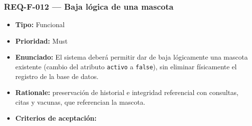 \documentclass[
  spanish,
]{article}
\providecommand{\tightlist}{%
  \setlength{\itemsep}{0pt}\setlength{\parskip}{0pt}}
\begin{document}
\subsubsection{REQ-F-012 --- Baja lógica de una
mascota}\label{req-f-012-baja-luxf3gica-de-una-mascota}

\begin{itemize}
\tightlist
\item
  \textbf{Tipo:} Funcional
\item
  \textbf{Prioridad:} Must
\item
  \textbf{Enunciado:} El sistema deberá permitir dar de baja lógicamente
  una mascota existente (cambio del atributo \texttt{activo} a
  \texttt{false}), sin eliminar físicamente el registro de la base de
  datos.
\item
  \textbf{Rationale:} preservación de historial e integridad referencial
  con consultas, citas y vacunas, que referencian la mascota.
\item
  \textbf{Criterios de aceptación:}


\end{itemize}
\end{document}
